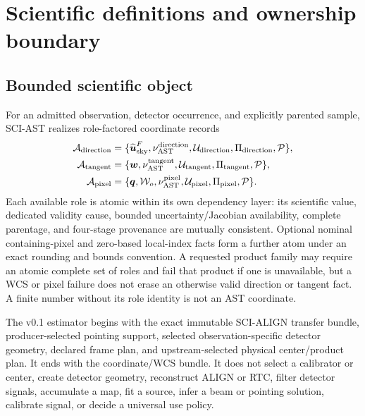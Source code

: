 \section{Scientific definitions and ownership boundary}
\label{sec:definitions}

\subsection{Bounded scientific object}

For an admitted observation, detector occurrence, and explicitly parented
sample, SCI-AST realizes role-factored coordinate records
\begin{equation}
 \begin{aligned}
 \mathcal A_{\rm direction}&=
   \{\widehat{\boldsymbol u}_{\rm sky}^{F},\nu_{\rm AST}^{\rm direction},
      \mathcal U_{\rm direction},\Pi_{\rm direction},\mathcal P\},\\
 \mathcal A_{\rm tangent}&=
   \{\boldsymbol w,\nu_{\rm AST}^{\rm tangent},\mathcal U_{\rm tangent},
      \Pi_{\rm tangent},\mathcal P\},\\
 \mathcal A_{\rm pixel}&=
   \{\boldsymbol q,\mathcal W_o,\nu_{\rm AST}^{\rm pixel},
      \mathcal U_{\rm pixel},\Pi_{\rm pixel},\mathcal P\}.
 \end{aligned}
 \label{eq:atomic-bundle}
\end{equation}
Each available role is atomic within its own dependency layer: its scientific
value, dedicated validity cause, bounded uncertainty/Jacobian availability,
complete parentage, and four-stage provenance are mutually consistent.
Optional nominal containing-pixel and zero-based local-index facts form a
further atom under an exact rounding and bounds convention.  A requested
product family may require an atomic complete set of roles and fail that
product if one is unavailable, but a WCS or pixel failure does not erase an
otherwise valid direction or tangent fact.  A finite number without its role
identity is not an AST coordinate.

The v0.1 estimator begins with the exact immutable SCI-ALIGN transfer bundle,
producer-selected pointing support, selected observation-specific detector
geometry, declared frame plan, and upstream-selected physical center/product
plan.  It ends with the coordinate/WCS bundle.  It does not select a
calibrator or center, create detector geometry, reconstruct ALIGN or RTC,
filter detector signals, accumulate a map, fit a source, infer a beam or
pointing solution, calibrate signal, or decide a universal use policy.

